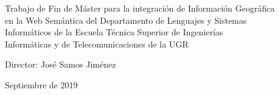 \begin{titlepage}
\begin{minipage}{\textwidth}

\begin{flushright}
    Trabajo de Fin de Máster para la integración de Información Geográfica \\ en la Web Semántica del Departamento de Lenguajes y Sistemas \\ Informáticos de la Escuela Técnica Superior de Ingenierías \\ Informáticas y de Telecomunicaciones de la UGR \\
    
    \vspace{0.2in}
    
    Director: José Samos Jiménez
\end{flushright}

\vspace{4cm}
Septiembre de 2019
\end{minipage}

 
\end{titlepage}


